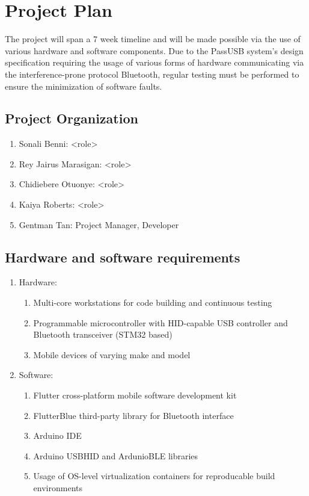 \documentclass[stu]{apa7}
\begin{document}
\section{Project Plan}

The project will span a 7 week timeline and will be made possible via the use of various hardware and software components. Due to the PassUSB system's design specification requiring the usage of various forms of hardware communicating via the interference-prone protocol Bluetooth, regular testing must be performed to ensure the minimization of software faults.

\subsection{Project Organization}
\begin{enumerate}
        \item Sonali Benni: <role>
        \item Rey Jairus Marasigan: <role>
        \item Chidiebere Otuonye: <role>
        \item Kaiya Roberts: <role>
        \item Gentman Tan: Project Manager, Developer
\end{enumerate}

\subsection{Hardware and software requirements}
\begin{enumerate}
  \item Hardware:
        \begin{enumerate}
                \item Multi-core workstations for code building and continuous testing
                \item Programmable microcontroller with HID-capable USB controller and Bluetooth transceiver (STM32 based)
                \item Mobile devices of varying make and model
        \end{enumerate}
  \item Software:
        \begin{enumerate}
                \item Flutter cross-platform mobile software development kit
                \item FlutterBlue third-party library for Bluetooth interface
                \item Arduino IDE
                \item Arduino USBHID and ArdunioBLE libraries
                \item Usage of OS-level virtualization containers for reproducable build environments
        \end{enumerate}
\end{enumerate}
\end{document}
